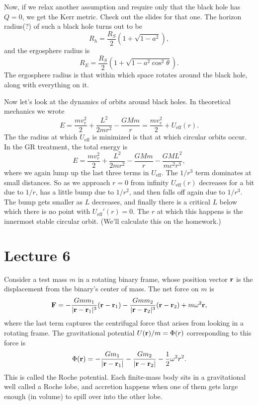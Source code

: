 \documentclass[../a122main.tex]{subfiles}
\begin{document}
Now, if we relax another assumption and require only that the black hole has $Q = 0$, we get the Kerr metric.
Check out the slides for that one.
The horizon radius(?) of such a black hole turns out to be
\[ R_h = \frac{R_S}{2} \left( 1 + \sqrt{1 - a^2} \right), \]
and the ergosphere radius is
\[ R_E = \frac{R_S}{2} \left( 1 + \sqrt{1 - a^2 \cos^2 \theta} \right). \]
The ergosphere radius is that within which space rotates around the black hole, along with everything on it.

Now let's look at the dynamics of orbits around black holes.
In theoretical mechanics we wrote
\[ E = \frac{mv_r^2}{2} + \frac{L^2}{2mr^2} - \frac{GMm}{r} = \frac{mv_r^2}{2} + U_\textrm{eff}(r). \]
The the radius at which $U_\textrm{eff}$ is minimized is that at which circular orbits occur.
In the GR treatment, the total energy is
\[ E = \frac{mv_r^2}{2} + \frac{L^2}{2mr^2} - \frac{GMm}{r} - \frac{GML^2}{mc^2 r^3}, \]
where we again lump up the last three terms in $U_\textrm{eff}$.
The $1 / r^3$ term dominates at small distances. 
So as we approach $r=0$ from infinity $U_\textrm{eff}(r)$ decreases for a bit due to $1 / r$, has a little bump due to $1 / r^2$, and then falls off again due to $1 / r^3$.
The bump gets smaller as $L$ decreases, and finally there is a critical $L$ below which there is no point with $U_\textrm{eff}'(r) = 0$.
The $r$ at which this happens is the innermost stable circular orbit.
(We'll calculate this on the homework.)

\section{Lecture 6}
Consider a test mass $m$ in a rotating binary frame, whose position vector $\mathbf{r}$ is the displacement from the binary's center of mass.
The net force on $m$ is
\[ \mathbf{F} = -\frac{Gmm_1}{|\mathbf{r} - \mathbf{r}_1|^3} (\mathbf{r} - \mathbf{r}_1) - \frac{Gmm_2}{|\mathbf{r} - \mathbf{r}_2|^3} (\mathbf{r} - \mathbf{r}_2) + m\omega^2 \mathbf{r}, \]
where the last term captures the centrifugal force that arises from looking in a rotating frame.
The gravitational potential $U(\mathbf{r}) / m = \Phi(r)$ corresponding to this force is
\[ \Phi(\mathbf{r}) = -\frac{Gm_1}{|\mathbf{r} - \mathbf{r}_1|} - \frac{Gm_2}{|\mathbf{r} - \mathbf{r}_2|} - \frac{1}{2} \omega^2 r^2. \]
This is called the Roche potential.
Each finite-mass body sits in a gravitational well called a Roche lobe, and accretion happens when one of them gets large enough (in volume) to spill over into the other lobe.
\end{document}
